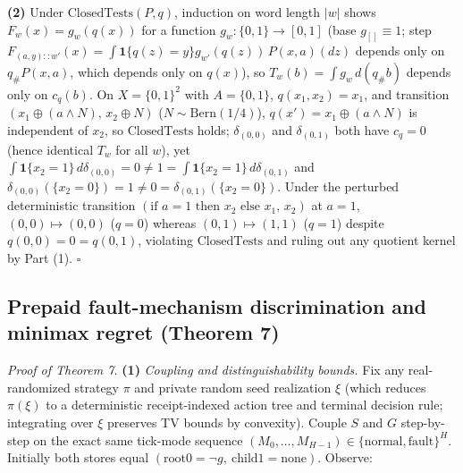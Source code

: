 \documentclass[11pt,a4paper]{article}
\newcounter{none}
\begin{document}
\textbf{(2)} Under \(\mathrm{ClosedTests}(P, q)\), induction on word
length \(|w|\) shows \(F_w(x) = g_w(q(x))\) for a function
\(g_w: \{0,1\} \to [0,1]\) (base \(g_{[]} \equiv 1\); step
\(F_{(a,y)::w'}(x) = \int \mathbf{1}\{q(z)=y\} g_{w'}(q(z))\, P(x,a)(dz)\)
depends only on \(q_\# P(x,a)\), which depends only on \(q(x)\)), so
\(T_w(b) = \int g_w\, d(q_\# b)\) depends only on \(c_q(b)\). On
\(X = \{0,1\}^2\) with \(A = \{0,1\}\), \(q(x_1,x_2) = x_1\), and
transition \((x_1 \oplus (a \land N),\, x_2 \oplus N)\)
(\(N \sim \mathrm{Bern}(1/4)\)), \(q(x') = x_1 \oplus (a \land N)\) is
independent of \(x_2\), so \(\mathrm{ClosedTests}\) holds;
\(\delta_{(0,0)}\) and \(\delta_{(0,1)}\) both have \(c_q = 0\) (hence
identical \(T_w\) for all \(w\)), yet
\(\int \mathbf{1}\{x_2=1\}\, d\delta_{(0,0)} = 0 \neq 1 = \int \mathbf{1}\{x_2=1\}\, d\delta_{(0,1)}\)
and
\(\delta_{(0,0)}(\{x_2=0\}) = 1 \neq 0 = \delta_{(0,1)}(\{x_2=0\})\).
Under the perturbed deterministic transition
\((\text{if } a = 1 \text{ then } x_2 \text{ else } x_1,\, x_2)\) at
\(a = 1\), \((0,0) \mapsto (0,0)\) (\(q = 0\)) whereas
\((0,1) \mapsto (1,1)\) (\(q = 1\)) despite \(q(0,0) = 0 = q(0,1)\),
violating \(\mathrm{ClosedTests}\) and ruling out any quotient kernel by
Part (1). \(\square\)

\subsection{Prepaid fault-mechanism discrimination and minimax regret
(Theorem
7)}\label{prepaid-fault-mechanism-discrimination-and-minimax-regret-theorem-7}

\emph{Proof of Theorem 7.} \textbf{(1)} \emph{Coupling and
distinguishability bounds.} Fix any real-randomized strategy \(\pi\) and
private random seed realization \(\xi\) (which reduces \(\pi(\xi)\) to a
deterministic receipt-indexed action tree and terminal decision rule;
integrating over \(\xi\) preserves TV bounds by convexity). Couple \(S\)
and \(G\) step-by-step on the exact same tick-mode sequence
\((M_0, \dots, M_{H-1}) \in \{\mathrm{normal}, \mathrm{fault}\}^H\).
Initially both stores equal
\((\mathrm{root0} = \neg g,\ \mathrm{child1} = \mathrm{none})\).
Observe:
\end{document}
